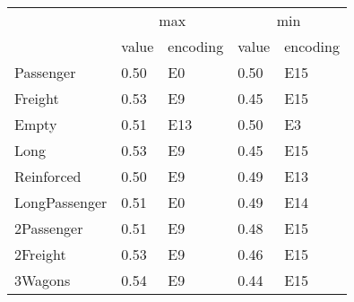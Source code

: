 \begin{tabular}{lllll}
\toprule
 & \multicolumn{2}{c}{max} & \multicolumn{2}{c}{min} \\
 & value & encoding & value & encoding \\
\midrule
Passenger & 0.50 & E0 & 0.50 & E15 \\
Freight & 0.53 & E9 & 0.45 & E15 \\
Empty & 0.51 & E13 & 0.50 & E3 \\
Long & 0.53 & E9 & 0.45 & E15 \\
Reinforced & 0.50 & E9 & 0.49 & E13 \\
LongPassenger & 0.51 & E0 & 0.49 & E14 \\
2Passenger & 0.51 & E9 & 0.48 & E15 \\
2Freight & 0.53 & E9 & 0.46 & E15 \\
3Wagons & 0.54 & E9 & 0.44 & E15 \\
\bottomrule
\end{tabular}

